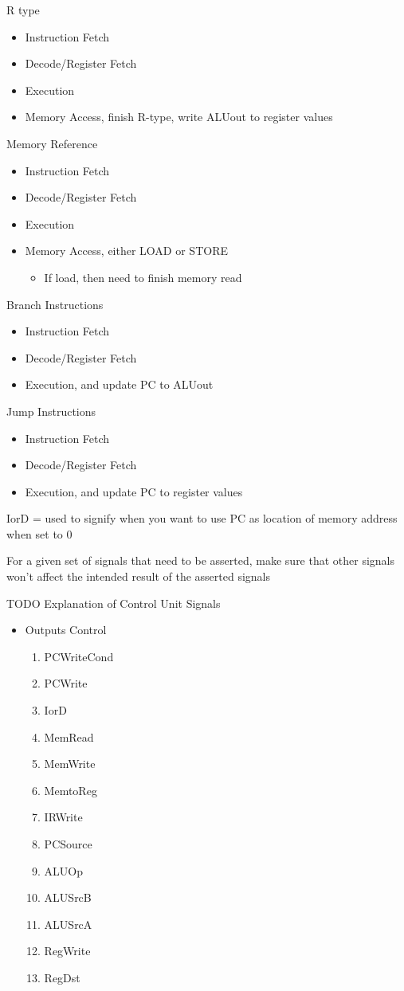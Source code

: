 \documentclass{article}
\begin{document}
		R type
		\begin{itemize}
			\item Instruction Fetch
			\item Decode/Register Fetch
			\item Execution
			\item Memory Access, finish R-type, write ALUout to register values
		\end{itemize}

		Memory Reference
		\begin{itemize}
			\item Instruction Fetch
			\item Decode/Register Fetch
			\item Execution
			\item Memory Access, either LOAD or STORE
			\begin{itemize}
				\item If load, then need to finish memory read
			\end{itemize}
		\end{itemize}

		Branch Instructions
		\begin{itemize}
			\item Instruction Fetch
			\item Decode/Register Fetch
			\item Execution, and update PC to ALUout
		\end{itemize}

		Jump Instructions
		\begin{itemize}
			\item Instruction Fetch
			\item Decode/Register Fetch
			\item Execution, and update PC to register values
		\end{itemize}

		IorD = used to signify when you want to use PC as location of memory address when set to 0

		For a given set of signals that need to be asserted, make sure that other signals won't affect the intended result of the asserted signals

		TODO
		Explanation of Control Unit Signals
		\begin{itemize}
			\item Outputs Control
			\begin{enumerate}
				\item PCWriteCond
				\item PCWrite
				\item IorD
				\item MemRead
				\item MemWrite
				\item MemtoReg
				\item IRWrite
				\item PCSource
				\item ALUOp
				\item ALUSrcB
				\item ALUSrcA
				\item RegWrite
				\item RegDst
			\end{enumerate}
		\end{itemize}
		
\end{document}

